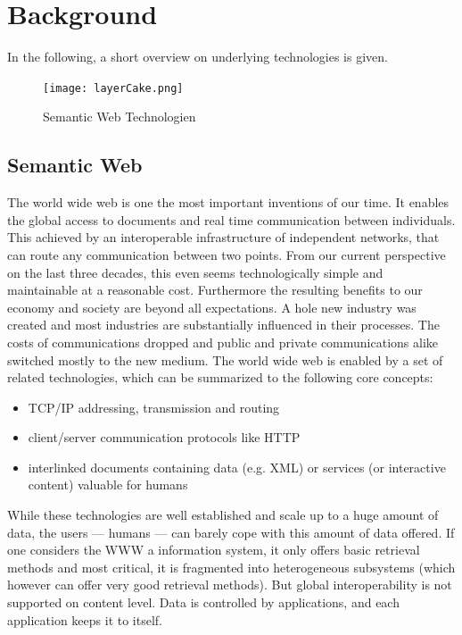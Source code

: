 \section{Background}
\label{sec:basics}

In the following, a short overview on underlying technologies is given. 
\begin{figure}
  \centering
    \texttt{[image: layerCake.png]}
  \caption{Semantic Web Technologien}
  \label{fig:layercake}
\end{figure}

\subsection{Semantic Web}
The world wide web is one the most important inventions of our time. 
It enables the global access to documents and real time communication between individuals.
This achieved by an interoperable infrastructure of independent networks, that can route any communication between two points.
From our current perspective on the last three decades, this even seems technologically simple and maintainable at a reasonable cost.
Furthermore the resulting benefits to our economy and society are beyond all expectations. A hole new industry was created and most industries are substantially influenced in their processes.
The costs of communications dropped and public and private communications alike switched mostly to the new medium.
The world wide web is enabled by a set of related technologies, which can be summarized to the following core concepts:
\begin{itemize}
\item TCP/IP addressing, transmission and routing
\item client/server communication protocols like HTTP
\item interlinked documents containing data (e.g. XML) or services (or interactive content) valuable for humans
\end{itemize}
While these technologies are well established and scale up to a huge amount of data, the users --- humans --- can barely cope with this amount of data offered. 
If one considers the WWW a information system, it only offers basic retrieval methods and most critical, it is fragmented into heterogeneous subsystems (which however can offer very good retrieval methods). 
But global interoperability is not supported on content level. 
Data is controlled by applications, and each application keeps it to itself.

